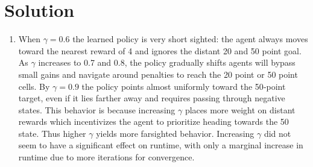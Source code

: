 \documentclass[submit]{../harvardml}
\newenvironment{solution}
  {\color{blue}\section*{Solution}}
{}
\begin{document}
\begin{solution}
\begin{enumerate}
        \item When $\gamma=0.6$ the learned policy is very short sighted: the agent always moves toward the nearest reward of 4 and ignores the distant 20 and 50 point goal. As $\gamma$ increases to 0.7 and 0.8, the policy gradually shifts agents will bypass small gains and navigate around penalties to reach the 20 point or 50 point cells. By $\gamma=0.9$ the policy points almost uniformly toward the 50‐point target, even if it lies farther away and requires passing through negative states. This behavior is because increasing $\gamma$ places more weight on distant rewards which incentivizes the agent to prioritize heading towards the 50 state. Thus higher $\gamma$ yields more farsighted behavior. Increasing $\gamma$ did not seem to have a significant effect on runtime, with only a marginal increase in runtime due to more iterations for convergence.
        \begin{figure}[htbp]
              \centering
              \hfill
              \\
\end{figure}
\end{enumerate}
\end{solution}
\end{document}
